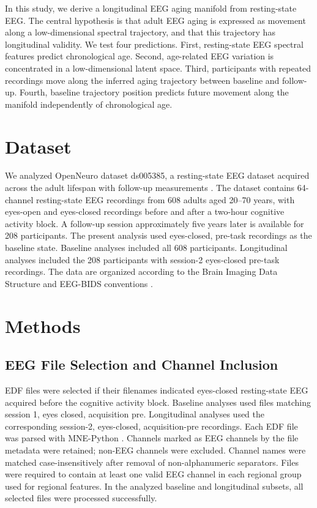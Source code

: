 \documentclass[journal]{IEEEtran}
\begin{document}
In this study, we derive a longitudinal EEG aging manifold from resting-state EEG. The central hypothesis is that adult EEG aging is expressed as movement along a low-dimensional spectral trajectory, and that this trajectory has longitudinal validity. We test four predictions. First, resting-state EEG spectral features predict chronological age. Second, age-related EEG variation is concentrated in a low-dimensional latent space. Third, participants with repeated recordings move along the inferred aging trajectory between baseline and follow-up. Fourth, baseline trajectory position predicts future movement along the manifold independently of chronological age.

\section{Dataset}

We analyzed OpenNeuro dataset ds005385, a resting-state EEG dataset acquired across the adult lifespan with follow-up measurements \cite{getzmann2024resting,openneuro_ds005385}. The dataset contains 64-channel resting-state EEG recordings from 608 adults aged 20--70 years, with eyes-open and eyes-closed recordings before and after a two-hour cognitive activity block. A follow-up session approximately five years later is available for 208 participants. The present analysis used eyes-closed, pre-task recordings as the baseline state. Baseline analyses included all 608 participants. Longitudinal analyses included the 208 participants with session-2 eyes-closed pre-task recordings. The data are organized according to the Brain Imaging Data Structure and EEG-BIDS conventions \cite{gorgolewski2016bids,pernet2019eegbids}.

\section{Methods}

\subsection{EEG File Selection and Channel Inclusion}

EDF files were selected if their filenames indicated eyes-closed resting-state EEG acquired before the cognitive activity block. Baseline analyses used files matching session 1, eyes closed, acquisition pre. Longitudinal analyses used the corresponding session-2, eyes-closed, acquisition-pre recordings. Each EDF file was parsed with MNE-Python \cite{gramfort2013meg}. Channels marked as EEG channels by the file metadata were retained; non-EEG channels were excluded. Channel names were matched case-insensitively after removal of non-alphanumeric separators. Files were required to contain at least one valid EEG channel in each regional group used for regional features. In the analyzed baseline and longitudinal subsets, all selected files were processed successfully.
\end{document}
